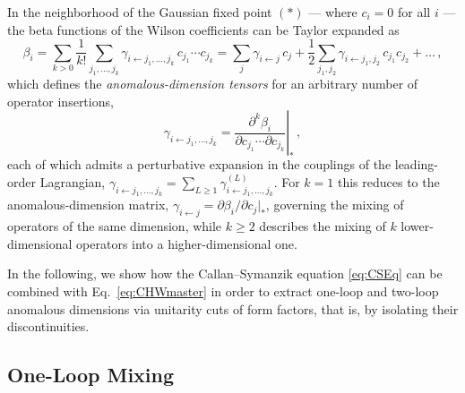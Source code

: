 In the neighborhood of the Gaussian fixed point $(*)$ --- where $c_i = 0$ for all $i$ --- the beta functions of the Wilson coefficients can be Taylor expanded as
\begin{equation}\label{eq:Taylorbeta}
    \beta_i = \sum_{k>0}\frac{1}{k!}\sum_{j_1,\dotsc,j_k}\gamma_{i\leftarrow j_1,\dotsc,j_k}\,c_{j_1}\dotsm c_{j_k}
    = \sum_j  \gamma_{i\leftarrow j}\,c_j + \frac{1}{2}\sum_{j_1,j_2}\gamma_{i\leftarrow j_1,j_2}\,c_{j_1}c_{j_2} + \dots \,,
\end{equation}
which defines the \textit{anomalous-dimension tensors} for an arbitrary number of operator insertions,
\begin{equation}\label{eq:gammagen}
    \gamma_{i\leftarrow j_1,\dotsc,j_k} = \left.\frac{\partial^k \beta_i}{\partial c_{j_1}\dotsm \partial c_{j_k}}\right|_{*}\,,
\end{equation}
each of which admits a perturbative expansion in the couplings of the leading-order Lagrangian, $\gamma_{i\leftarrow j_1,\dotsc,j_k} = \sum_{L\ge 1}\gamma^{(L)}_{i\leftarrow j_1,\dotsc,j_k}$.
For $k=1$ this reduces to the anomalous-dimension matrix, $\gamma_{i\leftarrow j} = \partial\beta_i/\partial c_j|_*$, governing the mixing of operators of the same dimension, while $k\ge 2$ describes the mixing of $k$ lower-dimensional operators into a higher-dimensional one.

In the following, we show how the Callan--Symanzik equation \eqref{eq:CSEq} can be combined with Eq.~\eqref{eq:CHWmaster} in order to extract one-loop and two-loop anomalous dimensions via unitarity cuts of form factors, that is, by isolating their discontinuities.

\subsection{One-Loop Mixing}

